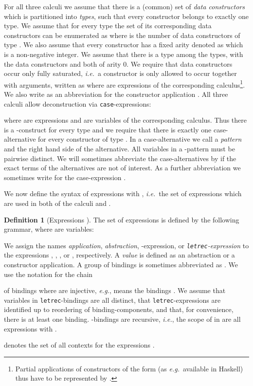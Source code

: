 \documentclass{LMCS}
\theoremstyle{plain}
\theoremstyle{definition}
\newtheorem{definition}[thm]{Definition}
\newcommand{\eg}{{\em e.g.}}
\newcommand{\ie}{{\em i.e.}}
\newcommand{\tletrec}{{\tt letrec}}
\newcommand{\tcase}{{\tt case}}
\begin{document}
For all three calculi we assume that there is a (common) set of 
{\em data constructors}  which is partitioned into {\em types}, such that 
every constructor  belongs to exactly one type. 
We assume that for every type  the set of its corresponding data constructors
can be enumerated as  where  is the number of
data constructors of type .
We also assume that every constructor has a fixed arity denoted as  
which is a non-negative integer.
We assume that there is a type  among the types, with the data
constructors  and  both of arity 0.
We require that data constructors occur only fully saturated, \ie\ a constructor
 is only allowed to occur together with  arguments, written as 
 where  are expressions of the corresponding 
calculus\footnote{Partial applications of constructors  of the form  
(as \eg\ available in Haskell) thus have to be represented by 
.
}. 
We also write  as an abbreviation for the constructor application
. 
All three calculi allow deconstruction via \tcase-expressions:

where  are expressions and  are variables of the corresponding calculus.
Thus there is a -construct for every type  and we require that 
there is exactly one case-alternative 
 for every constructor
 of type .
In a case-alternative  we 
call  a {\em pattern} and  the
right hand side of the alternative. 
All variables in a -pattern must be pairwise distinct.
We will sometimes abbreviate the case-alternatives by  if the exact 
terms of the alternatives are not of interest.
As a further abbreviation we sometimes write 
for the case-expression 
.

We now define the syntax of expressions with , \ie\ the set
 of expressions which are used in both of the calculi
 and .

\begin{definition}[Expressions ]
The set  of expressions is defined by the following grammar,
where  are variables:

We assign the names {\em application}, {\em abstraction}, -expression,
or {\em \tletrec-expression} to the expressions , ,
, or , respectively. 
A {\em value}  is defined as an abstraction or a constructor application.
A group of  bindings is sometimes abbreviated as . 
We use the notation  for the chain 

of bindings where  are injective, 
\eg,  means the bindings 
. 
We assume that variables  in \tletrec-bindings are all distinct, that 
\tletrec-expressions are identified up to reordering of binding-components,
and that, for convenience, there is at least one binding. 
-bindings are recursive, \ie, the scope of  in 
 are all expressions 
 with . 

 denotes the set of all contexts for the expressions .
\end{definition}
\end{document}
